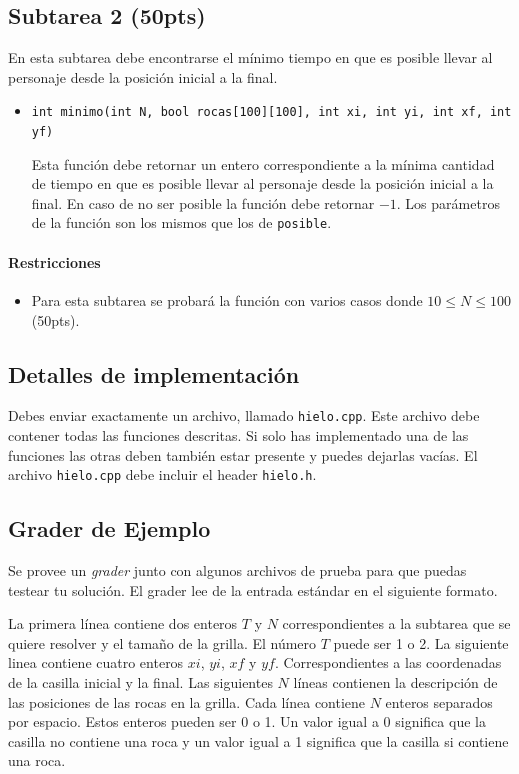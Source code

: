 \documentclass{oci}
\begin{document}
\subsection*{Subtarea 2 (50pts)}
En esta subtarea debe encontrarse el mínimo tiempo en que es posible llevar al personaje desde la posición inicial a la final.

\begin{itemize}
	\item \verb+int minimo(int N, bool rocas[100][100], int xi, int yi, int xf, int yf)+

	Esta función debe retornar un entero correspondiente a la mínima cantidad de tiempo en que es posible llevar al personaje desde la posición inicial a la final.
  En caso de no ser posible la función debe retornar $-1$.
  Los parámetros de la función son los mismos que los de \verb+posible+.
\end{itemize}

\paragraph{Restricciones}
\begin{itemize}
\item Para esta subtarea se probará la función con varios casos donde $10 \leq N\leq 100$ (50pts).
\end{itemize}

\subsection*{Detalles de implementación}
Debes enviar exactamente un archivo, llamado \verb+hielo.cpp+.
Este archivo debe contener todas las funciones descritas.
Si solo has implementado una de las funciones las otras deben también estar presente y puedes dejarlas vacías.
El archivo \verb+hielo.cpp+ debe incluir el header \verb+hielo.h+.

\subsection*{Grader de Ejemplo}
Se provee un \emph{grader} junto con algunos archivos de prueba para que puedas testear tu solución.
El grader lee de la entrada estándar en el siguiente formato.

La primera línea contiene dos enteros $T$ y $N$ correspondientes a la subtarea que se quiere resolver y el tamaño de la grilla.
El número $T$ puede ser 1 o 2.
La siguiente linea contiene cuatro enteros $xi$, $yi$, $xf$ y $yf$.
Correspondientes a las coordenadas de la casilla inicial y la final.
Las siguientes $N$ líneas contienen la descripción de las posiciones de las rocas en la grilla.
Cada línea contiene $N$ enteros separados por espacio.
Estos enteros pueden ser 0 o 1.
Un valor igual a 0 significa que la casilla no contiene una roca y un valor igual a 1 significa que la casilla si contiene una roca.
\end{document}
